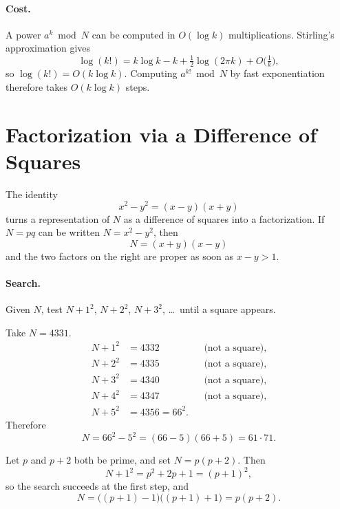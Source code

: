 \paragraph{Cost.}
A power $a^{k}\bmod N$ can be computed in $O(\log k)$ multiplications. Stirling's approximation gives
\begin{equation}
    \log(k!)
    = k\log k - k + \tfrac12\log(2\pi k) + O\bigl(\tfrac1k\bigr),
    \label{eq:stirling}
\end{equation}
so $\log(k!)=O(k\log k)$. Computing $a^{k!}\bmod N$ by fast exponentiation therefore takes $O(k\log k)$ steps.

\section{Factorization via a Difference of Squares}

The identity
\[
    x^2-y^2=(x-y)(x+y)
\]
turns a representation of $N$ as a difference of squares into a factorization. If $N=pq$ can be written $N=x^2-y^2$, then
\[
    N=(x+y)(x-y)
\]
and the two factors on the right are proper as soon as $x-y>1$.


\paragraph{Search.}
Given $N$, test $N+1^2$, $N+2^2$, $N+3^2$, \ldots\ until a square appears.

\begin{example}
Take $N=4331$.
\begin{align*}
    N+1^2 &= 4332 &&\text{(not a square)},\\
    N+2^2 &= 4335 &&\text{(not a square)},\\
    N+3^2 &= 4340 &&\text{(not a square)},\\
    N+4^2 &= 4347 &&\text{(not a square)},\\
    N+5^2 &= 4356 = 66^2.
\end{align*}
Therefore
\[
    N=66^2-5^2=(66-5)(66+5)=61\cdot 71.
\]
\end{example}

\begin{example}
Let $p$ and $p+2$ both be prime, and set $N=p(p+2)$. Then
\[
    N+1^2=p^2+2p+1=(p+1)^2,
\]
so the search succeeds at the first step, and
\[
    N=\bigl((p+1)-1\bigr)\bigl((p+1)+1\bigr)=p(p+2).
\]
\end{example}


